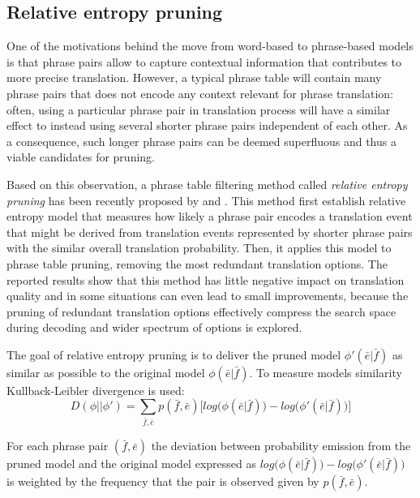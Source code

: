 \subsection{Relative entropy pruning}
\label{sec:relent-pruning}

One of the motivations behind the move from word-based to phrase-based models
is that phrase pairs allow to capture contextual information that contributes
to more precise translation.
However, a typical phrase table will contain many phrase pairs that does not
encode any context relevant for phrase translation: often, using a particular
phrase pair in translation process will have a similar effect to instead using
several shorter phrase pairs independent of each other.
As a consequence, such longer phrase pairs can be deemed superfluous and thus
a viable candidates for pruning.

Based on this observation, a phrase table filtering method called \emph{relative
entropy pruning} has been recently proposed by \citet{ling:relentfilter} and
\citet{zens:systcomp}.
This method first establish relative entropy model that measures how likely
a phrase pair encodes a translation event that might be derived from translation
events represented by shorter phrase pairs with the similar overall translation
probability. Then, it applies this model to phrase table pruning, removing
the most redundant translation options.
The reported results show that this method has little negative impact on
translation quality and in some situations can even lead to small improvements,
because the pruning of redundant translation options effectively compress
the search space during decoding and wider spectrum of options is explored.

The goal of relative entropy pruning is to deliver the pruned model $\phi'(\bar{e}|\bar{f})$
as similar as possible to the original model $\phi(\bar{e}|\bar{f})$.
To measure models similarity Kullback-Leibler divergence is used: %
\begin{equation}
  D(\phi||\phi') = \sum_{\bar{f},\bar{e}}{p(\bar{f},\bar{e}) \Big[log\big(\phi(\bar{e}|\bar{f})\big) - log\big(\phi'(\bar{e}|\bar{f})\big)\Big]}
\end{equation}

For each phrase pair $(\bar{f},\bar{e})$ the deviation between probability emission
from the pruned model and the original model expressed as
$log\big(\phi(\bar{e}|\bar{f})\big) - log\big(\phi'(\bar{e}|\bar{f})\big)$ is weighted
by the frequency that the pair is observed given by $p(\bar{f}, \bar{e})$.

